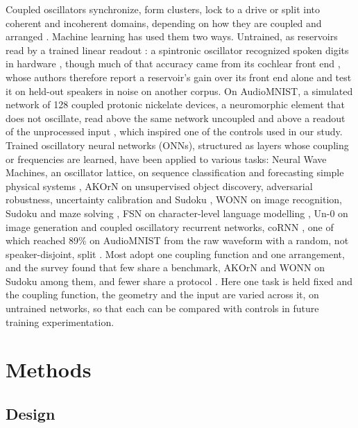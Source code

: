 \documentclass{article}
\makeatletter
\newcommand{\iclr@floatbarrier}{\par\vspace{\z@}%
  \ifx\@deferlist\@empty\else\clearpage\fi}
\let\iclr@section\section
\renewcommand{\section}{\iclr@floatbarrier\iclr@section}
\makeatother
\begin{document}
Coupled oscillators synchronize, form clusters, lock to a drive or split
into coherent and incoherent domains, depending on how they are coupled
and arranged
\citep{pikovsky2001, strogatz2000, kuramoto2002, abrams2004}. Machine
learning has used them two ways. Untrained, as reservoirs read by a
trained linear readout \citep{jaeger2001, maass2002, tanaka2019}: a
spintronic oscillator recognized spoken digits in hardware
\citep{torrejon2017}, though much of that accuracy came from its
cochlear front end \citep{abreu-araujo2020}, whose authors therefore
report a reservoir's gain over its front end alone and test it on
held-out speakers in noise on another corpus. On AudioMNIST, a simulated
network of 128 coupled protonic nickelate devices, a neuromorphic
element that does not oscillate, read above the same network uncoupled
and above a readout of the unprocessed input \citep{zhou2026}, which
inspired one of the controls used in our study. Trained oscillatory
neural networks (ONNs), structured as layers whose coupling or
frequencies are learned, have been applied to various tasks: Neural Wave
Machines, an oscillator lattice, on sequence classification and
forecasting simple physical systems \citep{keller2023}, AKOrN on
unsupervised object discovery, adversarial robustness, uncertainty
calibration and Sudoku \citep{miyato2025}, WONN on image recognition,
Sudoku and maze solving \citep{dai2026}, FSN on character-level language
modelling \citep{nunley2026}, Un-0 on image generation
\citep{unconv-ai2026} and coupled oscillatory recurrent networks, coRNN
\citep{rusch2021}, one of which reached 89\% on AudioMNIST from the raw
waveform with a random, not speaker-disjoint, split
\citep{chandravadia2026}. Most adopt one coupling function and one
arrangement, and the survey found that few share a benchmark, AKOrN and
WONN on Sudoku among them, and fewer share a protocol
\citep{kryski2026}. Here one task is held fixed and the coupling
function, the geometry and the input are varied across it, on untrained
networks, so that each can be compared with controls in future training
experimentation.

\section{Methods}\label{sec-3}

\subsection{Design}\label{sec-3-1}
\end{document}
